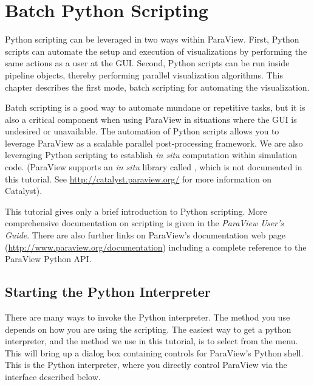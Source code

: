 \chapter{Batch Python Scripting}
\label{chap:BatchPythonScripting}


Python scripting can be leveraged in two ways within ParaView.  First,
Python scripts can automate the setup and execution of visualizations by
performing the same actions as a user at the GUI.  Second, Python scripts
can be run inside pipeline objects, thereby performing parallel
visualization algorithms.  This chapter describes the first mode, batch
scripting for automating the visualization.

Batch scripting is a good way to automate mundane or repetitive tasks, but
it is also a critical component when using ParaView in situations where the
GUI is undesired or unavailable.  The automation of Python scripts allows
you to leverage ParaView as a scalable parallel post-processing framework.
We are also leveraging Python scripting to establish \emph{in situ}
computation within simulation code. (ParaView supports an \emph{in situ}
library called , which is not documented
in this tutorial.  See
\href{http://catalyst.paraview.org/}{http://catalyst.paraview.org/} for
more information on Catalyst).

This tutorial gives only a brief introduction to Python scripting. More
comprehensive documentation on scripting is given in the \emph{ParaView
  User's Guide}. There are also further links on ParaView's documentation
web page
(\href{http://www.paraview.org/documentation}{http://www.paraview.org/documentation})
including a complete reference to the ParaView Python API.

\section{Starting the Python Interpreter}
\label{sec:StartingThePythonInterpreter}

There are many ways to invoke the Python interpreter.  The method you use
depends on how you are using the scripting.  The easiest way to get a
python interpreter, and the method we use in this tutorial, is to select
 \ra {} from the menu.  This will bring up a
dialog box containing controls for ParaView's Python shell. This is the 
Python interpreter, where you directly control
ParaView via the interface described below. 

